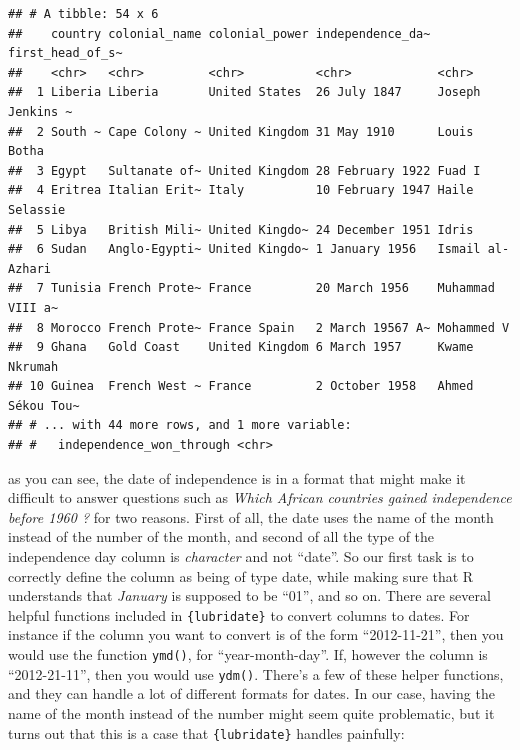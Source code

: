 \documentclass[]{gitbook}
\newenvironment{Shaded}{\begin{snugshade}}{\end{snugshade}}
\newcommand{\DataTypeTok}[1]{\textcolor[rgb]{0.13,0.29,0.53}{#1}}
\newcommand{\KeywordTok}[1]{\textcolor[rgb]{0.13,0.29,0.53}{\textbf{#1}}}
\newcommand{\NormalTok}[1]{#1}
\newcommand{\OperatorTok}[1]{\textcolor[rgb]{0.81,0.36,0.00}{\textbf{#1}}}
\newcommand{\StringTok}[1]{\textcolor[rgb]{0.31,0.60,0.02}{#1}}
\begin{document}
\begin{verbatim}
## # A tibble: 54 x 6
##    country colonial_name colonial_power independence_da~ first_head_of_s~
##    <chr>   <chr>         <chr>          <chr>            <chr>           
##  1 Liberia Liberia       United States  26 July 1847     Joseph Jenkins ~
##  2 South ~ Cape Colony ~ United Kingdom 31 May 1910      Louis Botha     
##  3 Egypt   Sultanate of~ United Kingdom 28 February 1922 Fuad I          
##  4 Eritrea Italian Erit~ Italy          10 February 1947 Haile Selassie  
##  5 Libya   British Mili~ United Kingdo~ 24 December 1951 Idris           
##  6 Sudan   Anglo-Egypti~ United Kingdo~ 1 January 1956   Ismail al-Azhari
##  7 Tunisia French Prote~ France         20 March 1956    Muhammad VIII a~
##  8 Morocco French Prote~ France Spain   2 March 19567 A~ Mohammed V      
##  9 Ghana   Gold Coast    United Kingdom 6 March 1957     Kwame Nkrumah   
## 10 Guinea  French West ~ France         2 October 1958   Ahmed Sékou Tou~
## # ... with 44 more rows, and 1 more variable:
## #   independence_won_through <chr>
\end{verbatim}

as you can see, the date of independence is in a format that might make it difficult to answer questions
such as \emph{Which African countries gained independence before 1960 ?} for two reasons. First of all,
the date uses the name of the month instead of the number of the month, and second of all the type of
the independence day column is \emph{character} and not ``date''. So our first task is to correctly define the column
as being of type date, while making sure that R understands that \emph{January} is supposed to be ``01'', and so
on. There are several helpful functions included in \texttt{\{lubridate\}} to convert columns to dates. For instance
if the column you want to convert is of the form ``2012-11-21'', then you would use the function \texttt{ymd()},
for ``year-month-day''. If, however the column is ``2012-21-11'', then you would use \texttt{ydm()}. There's
a few of these helper functions, and they can handle a lot of different formats for dates. In our case,
having the name of the month instead of the number might seem quite problematic, but it turns out
that this is a case that \texttt{\{lubridate\}} handles painfully:

\begin{Shaded}
\end{Shaded}
\end{document}
